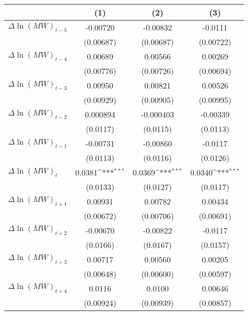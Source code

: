 {
\def\sym#1{\ifmmode^{#1}\else\(^{#1}\)\fi}
\begin{tabular}{l*{3}{c}}
\hline\hline
          &\multicolumn{1}{c}{(1)}         &\multicolumn{1}{c}{(2)}         &\multicolumn{1}{c}{(3)}         \\
\hline
$\Delta \ln(MW)_{t-5}$& -0.00720         & -0.00832         &  -0.0111         \\
          &(0.00687)         &(0.00687)         &(0.00722)         \\
[1em]
$\Delta \ln(MW)_{t-4}$&  0.00689         &  0.00566         &  0.00269         \\
          &(0.00776)         &(0.00726)         &(0.00694)         \\
[1em]
$\Delta \ln(MW)_{t-3}$&  0.00950         &  0.00821         &  0.00526         \\
          &(0.00929)         &(0.00905)         &(0.00995)         \\
[1em]
$\Delta \ln(MW)_{t-2}$& 0.000894         &-0.000403         & -0.00339         \\
          & (0.0117)         & (0.0115)         & (0.0113)         \\
[1em]
$\Delta \ln(MW)_{t-1}$& -0.00731         & -0.00860         &  -0.0117         \\
          & (0.0113)         & (0.0116)         & (0.0126)         \\
[1em]
$\Delta \ln(MW)_{t}$&   0.0381\sym{***}&   0.0369\sym{***}&   0.0340\sym{***}\\
          & (0.0133)         & (0.0127)         & (0.0117)         \\
[1em]
$\Delta \ln(MW)_{t+1}$&  0.00931         &  0.00782         &  0.00434         \\
          &(0.00672)         &(0.00706)         &(0.00691)         \\
[1em]
$\Delta \ln(MW)_{t+2}$& -0.00670         & -0.00822         &  -0.0117         \\
          & (0.0166)         & (0.0167)         & (0.0157)         \\
[1em]
$\Delta \ln(MW)_{t+3}$&  0.00717         &  0.00560         &  0.00205         \\
          &(0.00648)         &(0.00600)         &(0.00597)         \\
[1em]
$\Delta \ln(MW)_{t+4}$&   0.0116         &   0.0100         &  0.00646         \\
          &(0.00924)         &(0.00939)         &(0.00857)         \\

\end{tabular}}
